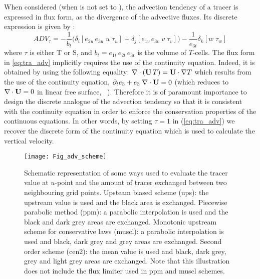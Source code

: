 \documentclass[../main/NEMO_manual]{subfiles}
\begin{document}
When considered (\ie when  is not set to ),
the advection tendency of a tracer is expressed in flux form,
\ie as the divergence of the advective fluxes.
Its discrete expression is given by :
\begin{equation}
  \label{eq:tra_adv}
  ADV_\tau = - \frac{1}{b_t} \Big(   \delta_i [ e_{2u} \, e_{3u} \; u \; \tau_u]
                                   + \delta_j [ e_{1v} \, e_{3v} \; v \; \tau_v] \Big)
             - \frac{1}{e_{3t}} \delta_k [w \; \tau_w]
\end{equation}
where $\tau$ is either T or S, and $b_t = e_{1t} \, e_{2t} \, e_{3t}$ is the volume of $T$-cells.
The flux form in \autoref{eq:tra_adv} implicitly requires the use of the continuity equation.
Indeed, it is obtained by using the following equality: $\nabla \cdot (\mathbf{U} \, T) = \mathbf{U} \cdot \nabla T$ which
results from the use of the continuity equation, $\partial_t e_3 + e_3 \; \nabla \cdot \mathbf{U} = 0$
(which reduces to $\nabla \cdot \mathbf{U} = 0$ in linear free surface, \ie {}~).
Therefore it is of paramount importance to design the discrete analogue of the advection tendency so that
it is consistent with the continuity equation in order to enforce the conservation properties of
the continuous equations.
In other words, by setting $\tau = 1$ in (\autoref{eq:tra_adv}) we recover the discrete form of
the continuity equation which is used to calculate the vertical velocity.
\begin{figure}[!t]
  \begin{center}
    \texttt{[image: Fig\_adv\_scheme]}
    \caption{
      \protect\label{fig:adv_scheme}
      Schematic representation of some ways used to evaluate the tracer value at $u$-point and
      the amount of tracer exchanged between two neighbouring grid points.
      Upsteam biased scheme (ups):
      the upstream value is used and the black area is exchanged.
      Piecewise parabolic method (ppm):
      a parabolic interpolation is used and the black and dark grey areas are exchanged.
      Monotonic upstream scheme for conservative laws (muscl):
      a parabolic interpolation is used and black, dark grey and grey areas are exchanged.
      Second order scheme (cen2):
      the mean value is used and black, dark grey, grey and light grey areas are exchanged.
      Note that this illustration does not include the flux limiter used in ppm and muscl schemes.
    }
  \end{center}
\end{figure}
\end{document}
